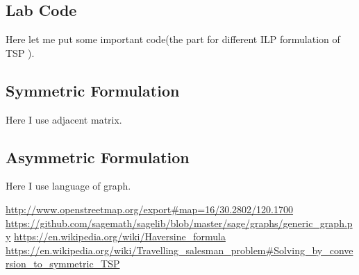 \documentclass{mcmthesis}
\begin{document}
\begin{appendices}
\section{Lab Code}
Here let me put some important code(the part for different ILP formulation of TSP ).
%	
	\subsection{Symmetric Formulation} \label{code:sage}
	Here I use adjacent matrix. 
	
	\subsection{Asymmetric Formulation}
	Here I use language of graph. 
	 \label{code:sage2}
%		
%					
\end{appendices}


\begin{thebibliography}{99}
	 \url{http://www.openstreetmap.org/export#map=16/30.2802/120.1700}
	 \url{https://github.com/sagemath/sagelib/blob/master/sage/graphs/generic_graph.py}	
	  \url{https://en.wikipedia.org/wiki/Haversine_formula}
	 \url{https://en.wikipedia.org/wiki/Travelling_salesman_problem#Solving_by_conversion_to_symmetric_TSP}
\end{thebibliography}
\end{document}
